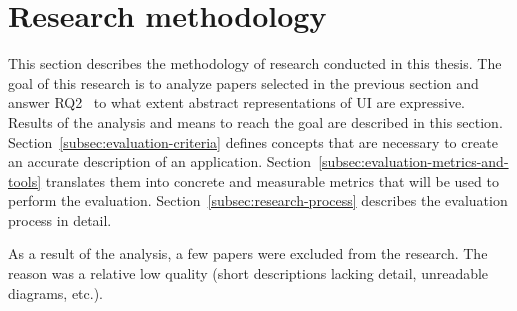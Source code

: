 \section{Research methodology}\label{sec:research-methodology}


This section describes the methodology of research conducted in this thesis.
The goal of this research is to analyze papers selected in the previous section and answer RQ2 \textendash\ to what extent abstract representations of UI are expressive.
Results of the analysis and means to reach the goal are described in this section.
Section~\ref{subsec:evaluation-criteria} defines concepts that are necessary to create an accurate description of an application.
Section~\ref{subsec:evaluation-metrics-and-tools} translates them into concrete and measurable metrics that will be used to perform the evaluation.
Section~\ref{subsec:research-process} describes the evaluation process in detail.

As a result of the analysis, a few papers were excluded from the research.
The reason was a relative low quality (short descriptions lacking detail, unreadable diagrams, etc.).




